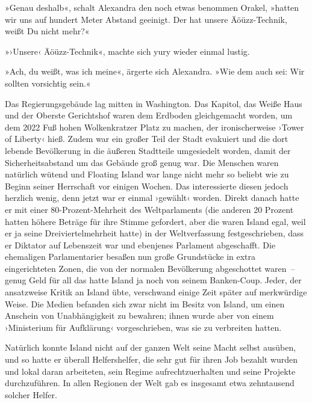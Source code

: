 »Genau deshalb«, schalt Alexandra den noch etwas benommen Orakel, »hatten wir uns auf hundert Meter Abstand geeinigt. Der hat unsere Äöüzz-Technik, weißt Du nicht mehr?«

»›Unsere‹ Äöüzz-Technik«, machte sich yury wieder einmal lustig.

»Ach, du weißt, was ich meine«, ärgerte sich Alexandra. »Wie dem auch sei: Wir sollten vorsichtig sein.«

Das Regierungsgebäude lag mitten in Washington. Das Kapitol, das Weiße Haus und der Oberste Gerichtshof waren dem Erdboden gleichgemacht worden, um dem 2022 Fuß hohen Wolkenkratzer Platz zu machen, der ironischerweise ›Tower of Liberty‹ hieß. Zudem war ein großer Teil der Stadt evakuiert und die dort lebende Bevölkerung in die äußeren Stadtteile umgesiedelt worden, damit der Sicherheitsabstand um das Gebäude groß genug war. Die Menschen waren natürlich wütend und Floating Island war lange nicht mehr so beliebt wie zu Beginn seiner Herrschaft vor einigen Wochen. Das interessierte diesen jedoch herzlich wenig, denn jetzt war er einmal ›gewählt‹ worden. Direkt danach hatte er mit einer 80-Prozent-Mehrheit des Weltparlaments (die anderen 20 Prozent hatten höhere Beträge für ihre Stimme gefordert, aber die waren Island egal, weil er ja seine Dreiviertelmehrheit hatte) in der Weltverfassung festgeschrieben, dass er Diktator auf Lebenszeit war und ebenjenes Parlament abgeschafft. Die ehemaligen Parlamentarier besaßen nun große Grundstücke in extra eingerichteten Zonen, die von der normalen Bevölkerung abgeschottet waren~– genug Geld für all das hatte Island ja noch von seinem Banken-Coup. Jeder, der ansatzweise Kritik an Island übte, verschwand einige Zeit später auf merkwürdige Weise. Die Medien befanden sich zwar nicht im Besitz von Island, um einen Anschein von Unabhängigkeit zu bewahren; ihnen wurde aber von einem ›Ministerium für Aufklärung‹ vorgeschrieben, was sie zu verbreiten hatten.

Natürlich konnte Island nicht auf der ganzen Welt seine Macht selbst ausüben, und so hatte er überall Helfershelfer, die sehr gut für ihren Job bezahlt wurden und lokal daran arbeiteten, sein Regime aufrechtzuerhalten und seine Projekte durchzuführen. In allen Regionen der Welt gab es insgesamt etwa zehntausend solcher Helfer.

